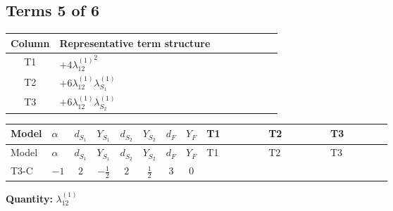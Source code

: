 \documentclass[8pt]{article}
\begin{document}
\begin{landscape}
\subsection*{Terms 5 of 6}
\begin{center}
\begin{tabular}{@{}c >{\raggedright\arraybackslash}p{0.82\linewidth}@{}}
\toprule
Column & Representative term structure \\
\midrule
T1 & \(\displaystyle +4 {\lambda_{12}^{(1)}}^2\) \\
\midrule
T2 & \(\displaystyle +6 {\lambda_{12}^{(1)}} {\lambda_{S_1}^{(1)}}\) \\
\midrule
T3 & \(\displaystyle +6 {\lambda_{12}^{(1)}} {\lambda_{S_2}^{(1)}}\) \\
\midrule
\bottomrule
\end{tabular}
\end{center}
\smallskip
\tiny
\begin{longtable}{@{}llcccccc >{\raggedright\arraybackslash}p{0.21\linewidth} >{\raggedright\arraybackslash}p{0.21\linewidth} >{\raggedright\arraybackslash}p{0.21\linewidth}@{}}
\toprule
Model & $\alpha$ & $d_{S_1}$ & $Y_{S_1}$ & $d_{S_2}$ & $Y_{S_2}$ & $d_F$ & $Y_F$ & T1 & T2 & T3 \\
\midrule
\endfirsthead
\toprule
Model & $\alpha$ & $d_{S_1}$ & $Y_{S_1}$ & $d_{S_2}$ & $Y_{S_2}$ & $d_F$ & $Y_F$ & T1 & T2 & T3 \\
\midrule
\endhead
T3-C & $-1$ & $2$ & $-\frac{1}{2}$ & $2$ & $\frac{1}{2}$ & $3$ & $0$ & \scriptsize\adjustbox{max width=\linewidth}{$\begin{gathered} +4 {\lambda_{12}^{(1)}}^2\end{gathered}$} & \scriptsize\adjustbox{max width=\linewidth}{$\begin{gathered} +6 {\lambda_{12}^{(1)}} {\lambda_{S_1}^{(1)}}\end{gathered}$} & \scriptsize\adjustbox{max width=\linewidth}{$\begin{gathered} +6 {\lambda_{12}^{(1)}} {\lambda_{S_2}^{(1)}}\end{gathered}$} \\
\midrule
\bottomrule
\end{longtable}
\clearpage
\noindent\textbf{Quantity: }$\lambda_{12}^{(1)}$\par\smallskip

\end{landscape}
\end{document}

